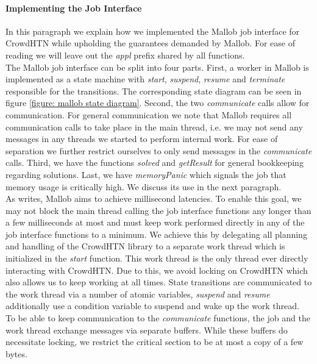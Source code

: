 \paragraph{Implementing the Job Interface}
In this paragraph we explain how we implemented the Mallob job interface for CrowdHTN while upholding the guarantees demanded by Mallob. For ease of reading we will leave out the \textit{appl} prefix shared by all functions. \\
The Mallob job interface can be split into four parts. First, a worker in Mallob is implemented as a state machine with \textit{start}, \textit{suspend}, \textit{resume} and \textit{terminate} responsible for the transitions. The corresponding state diagram can be seen in figure \ref{figure: mallob state diagram}. Second, the two \textit{communicate} calls allow for communication. For general communication we note that Mallob requires all communication calls to take place in the main thread, i.e. we may not send any messages in any threads we started to perform internal work. For ease of separation we further restrict ourselves to only send messages in the \textit{communicate} calls. Third, we have the functions \textit{solved} and \textit{getResult} for general bookkeeping regarding solutions. Last, we have \textit{memoryPanic} which signals the job that memory usage is critically high. We discuss its use in the next paragraph. \\
As \cite{schreiber2021scalable} writes, Mallob aims to achieve millisecond latencies. To enable this goal, we may not block the main thread calling the job interface functions any longer than a few milliseconds at most and must keep work performed directly in any of the job interface functions to a minimum. We achieve this by delegating all planning and handling of the CrowdHTN library to a separate work thread which is initialized in the \textit{start} function. This work thread is the only thread ever directly interacting with CrowdHTN. Due to this, we avoid locking on CrowdHTN which also allows us to keep working at all times. State transitions are communicated to the work thread via a number of atomic variables, \textit{suspend} and \textit{resume} additionally use a condition variable to suspend and wake up the work thread. \\
To be able to keep communication to the \textit{communicate} functions, the job and the work thread exchange messages via separate buffers. While these buffers do necessitate locking, we restrict the critical section to be at most a copy of a few bytes. \\
